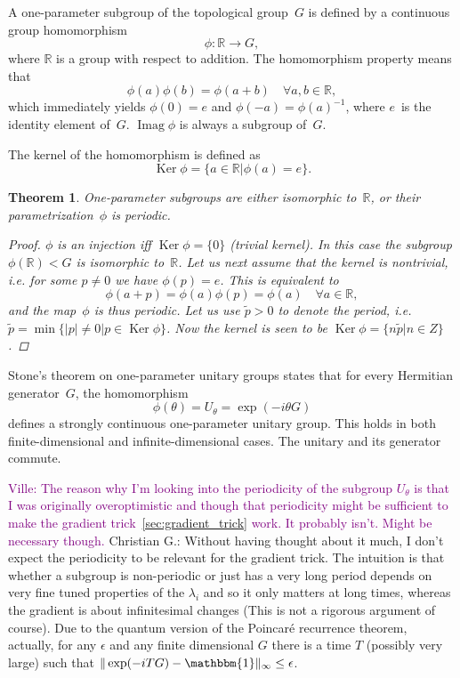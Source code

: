 \documentclass[aps,pra,10pt,twocolumn,groupedaddress,nofootinbib]{revtex4-1}
\theoremstyle{plain}
\newtheorem{theorem}{Theorem}%
\DeclareMathOperator{\Ker}{Ker}    %
\DeclareMathOperator{\Imag}{Imag}  %
\newcommand{\be}{\begin{equation}}
\newcommand{\ee}{\end{equation}}
\newcommand{\R}{\ensuremath{\mathbb R}}  %
\newcommand{\I}{\mathbbm{1}} %
\newcommand{\ville}[1]{\textcolor{purple}{Ville: #1}}
\newcommand{\cg}[1]{\textcolor{cyan!80!black}{Christian G.: #1}}
\begin{document}
A one-parameter subgroup of the topological group~$G$ is defined by a continuous group homomorphism
\be
\phi: \R \to G,
\ee
where $\R$ is a group with respect to addition.
The homomorphism property means that
\be
\phi(a)\phi(b) = \phi(a+b) \quad \forall a,b \in \R,
\ee
which immediately yields
$\phi(0) = e$ and $\phi(-a) = \phi(a)^{-1}$,
where $e$~is the identity element of~$G$.
$\Imag \phi$ is always a subgroup of~$G$.

The kernel of the homomorphism is defined as
\be
\Ker \phi = \{a \in \R | \phi(a) = e\}.
\ee

\begin{theorem}
  \label{th:1psg}
One-parameter subgroups are either isomorphic to~$\R$, or their parametrization~$\phi$ is periodic.

\begin{proof}
$\phi$ is an injection iff $\Ker \phi = \{0\}$ (trivial kernel).
In this case the subgroup $\phi(\R) < G$ is isomorphic to~$\R$.
Let us next assume that the kernel is nontrivial, i.e. for some $p \neq 0$ we have
$\phi(p) = e$.
This is equivalent to
\be
\phi(a+p) = \phi(a)\phi(p) = \phi(a) \quad \forall a \in \R,
\ee
and the map~$\phi$ is thus periodic. Let us use $\tilde{p}>0$
to denote the period, i.e.
$\tilde{p} = \min \{|p| \neq 0 | p \in \Ker \phi\}$.
Now the kernel is seen to be $\Ker \phi = \{n \tilde{p} | n \in Z\}$.
\end{proof}
\end{theorem}

Stone's theorem on one-parameter unitary groups states that
for every Hermitian generator~$G$, the homomorphism
\be
\label{eq:1pug}
\phi(\theta) = U_\theta = \exp(-i \theta G)
\ee
defines a strongly continuous one-parameter unitary group.
This holds in both finite-dimensional and infinite-dimensional cases.
The unitary and its generator commute.

\ville{The reason why I'm looking into the periodicity of the subgroup $U_\theta$ is that I was originally
  overoptimistic and though that periodicity might be sufficient to make the gradient trick~\ref{sec:gradient_trick} work. It probably isn't.
  Might be necessary though.}
\cg{Without having thought about it much, I don't expect the periodicity to be relevant for the gradient trick. The intuition is that whether a subgroup is non-periodic or just has a very long period depends on very fine tuned properties of the $\lambda_i$ and so it only matters at long times, whereas the gradient is about infinitesimal changes (This is not a rigorous argument of course). Due to the quantum version of the Poincar\'{e} recurrence theorem, actually, for any $\epsilon$ and any finite dimensional $G$ there is a time $T$ (possibly very large) such that $\|\exp(-i T G) - \I \|_\infty \leq \epsilon$.}
\end{document}
